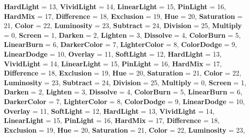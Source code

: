 \begin{DoxyCompactItemize}
{\bfseries Hard\+Light} = 13, 
\newline
{\bfseries Vivid\+Light} = 14, 
{\bfseries Linear\+Light} = 15, 
{\bfseries Pin\+Light} = 16, 
{\bfseries Hard\+Mix} = 17, 
\newline
{\bfseries Difference} = 18, 
{\bfseries Exclusion} = 19, 
{\bfseries Hue} = 20, 
{\bfseries Saturation} = 21, 
\newline
{\bfseries Color} = 22, 
{\bfseries Luminosity} = 23, 
{\bfseries Subtract} = 24, 
{\bfseries Division} = 25, 
\newline
{\bfseries Multiply} = 0, 
{\bfseries Screen} = 1, 
{\bfseries Darken} = 2, 
{\bfseries Lighten} = 3, 
\newline
{\bfseries Dissolve} = 4, 
{\bfseries Color\+Burn} = 5, 
{\bfseries Linear\+Burn} = 6, 
{\bfseries Darker\+Color} = 7, 
\newline
{\bfseries Lighter\+Color} = 8, 
{\bfseries Color\+Dodge} = 9, 
{\bfseries Linear\+Dodge} = 10, 
{\bfseries Overlay} = 11, 
\newline
{\bfseries Soft\+Light} = 12, 
{\bfseries Hard\+Light} = 13, 
{\bfseries Vivid\+Light} = 14, 
{\bfseries Linear\+Light} = 15, 
\newline
{\bfseries Pin\+Light} = 16, 
{\bfseries Hard\+Mix} = 17, 
{\bfseries Difference} = 18, 
{\bfseries Exclusion} = 19, 
\newline
{\bfseries Hue} = 20, 
{\bfseries Saturation} = 21, 
{\bfseries Color} = 22, 
{\bfseries Luminosity} = 23, 
\newline
{\bfseries Subtract} = 24, 
{\bfseries Division} = 25, 
{\bfseries Multiply} = 0, 
{\bfseries Screen} = 1, 
\newline
{\bfseries Darken} = 2, 
{\bfseries Lighten} = 3, 
{\bfseries Dissolve} = 4, 
{\bfseries Color\+Burn} = 5, 
\newline
{\bfseries Linear\+Burn} = 6, 
{\bfseries Darker\+Color} = 7, 
{\bfseries Lighter\+Color} = 8, 
{\bfseries Color\+Dodge} = 9, 
\newline
{\bfseries Linear\+Dodge} = 10, 
{\bfseries Overlay} = 11, 
{\bfseries Soft\+Light} = 12, 
{\bfseries Hard\+Light} = 13, 
\newline
{\bfseries Vivid\+Light} = 14, 
{\bfseries Linear\+Light} = 15, 
{\bfseries Pin\+Light} = 16, 
{\bfseries Hard\+Mix} = 17, 
\newline
{\bfseries Difference} = 18, 
{\bfseries Exclusion} = 19, 
{\bfseries Hue} = 20, 
{\bfseries Saturation} = 21, 
\newline
{\bfseries Color} = 22, 
{\bfseries Luminosity} = 23, 

\end{DoxyCompactItemize}
